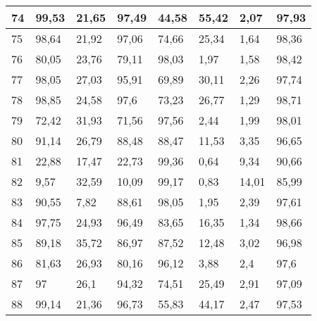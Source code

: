 \begin{longtable}[c]{|l|l|l|l|l|l|l|l|}
74              & 99,53        & 21,65        & 97,49       & 44,58         & 55,42         & 2,07          & 97,93         \\ \hline
75              & 98,64        & 21,92        & 97,06       & 74,66         & 25,34         & 1,64          & 98,36         \\ \hline
76              & 80,05        & 23,76        & 79,11       & 98,03         & 1,97          & 1,58          & 98,42         \\ \hline
77              & 98,05        & 27,03        & 95,91       & 69,89         & 30,11         & 2,26          & 97,74         \\ \hline
78              & 98,85        & 24,58        & 97,6        & 73,23         & 26,77         & 1,29          & 98,71         \\ \hline
79              & 72,42        & 31,93        & 71,56       & 97,56         & 2,44          & 1,99          & 98,01         \\ \hline
80              & 91,14        & 26,79        & 88,48       & 88,47         & 11,53         & 3,35          & 96,65         \\ \hline
81              & 22,88        & 17,47        & 22,73       & 99,36         & 0,64          & 9,34          & 90,66         \\ \hline
82              & 9,57         & 32,59        & 10,09       & 99,17         & 0,83          & 14,01         & 85,99         \\ \hline
83              & 90,55        & 7,82         & 88,61       & 98,05         & 1,95          & 2,39          & 97,61         \\ \hline
84              & 97,75        & 24,93        & 96,49       & 83,65         & 16,35         & 1,34          & 98,66         \\ \hline
85              & 89,18        & 35,72        & 86,97       & 87,52         & 12,48         & 3,02          & 96,98         \\ \hline
86              & 81,63        & 26,93        & 80,16       & 96,12         & 3,88          & 2,4           & 97,6          \\ \hline
87              & 97           & 26,1         & 94,32       & 74,51         & 25,49         & 2,91          & 97,09         \\ \hline
88              & 99,14        & 21,36        & 96,73       & 55,83         & 44,17         & 2,47          & 97,53         \\ \hline

\end{longtable}
